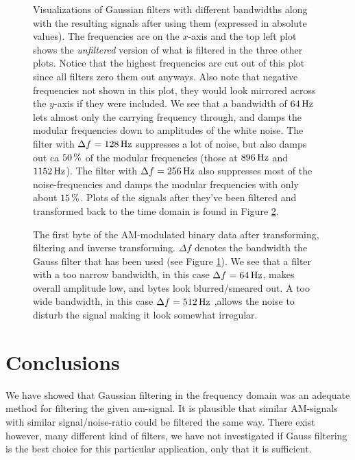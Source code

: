 \documentclass[12pt,a4paper]{article}
\begin{document}
\begin{figure}
  \begin{small}
  \centering
  
  \caption{
    Visualizations of Gaussian filters with different bandwidths
    along with the resulting signals after using them (expressed
    in absolute values).
    The frequencies are on the $x$-axis and the top left plot shows 
    the \emph{unfiltered} version of what is filtered in the three other plots.
    Notice that the highest frequencies are cut out of this plot since
    all filters zero them out anyways.
    Also note that negative frequencies not shown in this plot, they would
    look mirrored across the $y$-axis if they were included.
    We see that a bandwidth of $\unit[64]{Hz}$ lets almost only the carrying frequency
    through, and damps the modular frequencies down to amplitudes of the white
    noise. The filter with $\Delta f = \unit[128]{Hz}$ suppresses a lot of noise,
    but also damps out ca $\unit[50]{\%}$ of the modular frequencies 
    (those at $\unit[896]{Hz}$ and $\unit[1152]{Hz}$).
    The filter with
    $\Delta f = \unit[256]{Hz}$ also suppresses most of the noise-frequencies
    and damps the modular frequencies with only about $\unit[15]{\%}$.
    Plots of the signals after they've been filtered and transformed back
    to the time domain is found in Figure \ref{fig:different_bandwidths}.
  }
  \label{fig:different_filters}
  \end{small}
\end{figure}

\begin{figure}
  \begin{small}
  \centering
  
  \caption{
    The first byte of the AM-modulated binary data after transforming,
    filtering and inverse transforming. $\Delta f$ denotes the bandwidth
    the Gauss filter that has been used (see Figure \ref{fig:different_filters}).
    We see that a filter with a too narrow bandwidth, in this case $\Delta f = \unit[64]{Hz}$,
    makes overall amplitude low, and bytes look blurred/smeared out.
    A too wide bandwidth, in this case $\Delta f = \unit[512]{Hz}$ ,allows
    the noise to disturb the signal making it look somewhat irregular.
  }
  \label{fig:different_bandwidths}
  \end{small}
\end{figure}



\section{Conclusions} %
We have showed that Gaussian filtering in the frequency domain was
an adequate method for filtering the given am-signal.
It is plausible that similar AM-signals with similar signal/noise-ratio could
be filtered the same way. There exist however, many different kind of filters,
we have not investigated if Gauss filtering is the best choice for this particular
application, only that it is sufficient.
\end{document}
